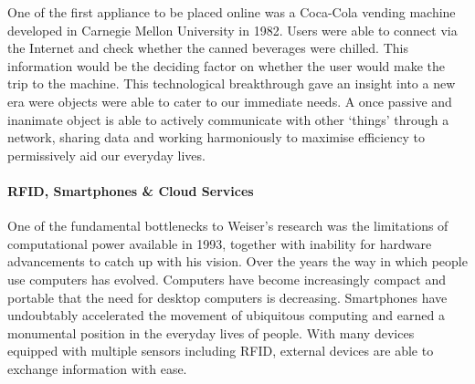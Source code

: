 \documentclass[a4paper, 11pt]{article}
\begin{document}
One of the first appliance to be placed online was a Coca-Cola vending machine developed in Carnegie Mellon University in 1982. Users were able to connect via the Internet and check whether the canned beverages were chilled. This information would be the deciding factor on whether the user would make the trip to the machine. This technological breakthrough gave an insight into a new era were objects were able to cater to our immediate needs. A once passive and inanimate object is able to actively communicate with other `things' through a network, sharing data and working harmoniously to maximise efficiency to permissively aid our everyday lives.

\paragraph{RFID, Smartphones \& Cloud Services}One of the fundamental bottlenecks to Weiser's research was the limitations of computational power available in 1993\cite{weiserLimit}, together with inability for hardware advancements to catch up with his vision. Over the years the way in which people use computers has evolved. Computers have become increasingly compact and portable that the need for desktop computers is decreasing. Smartphones have undoubtably accelerated the movement of ubiquitous computing and earned a monumental position in the everyday lives of people. With many devices equipped with multiple sensors including RFID, external devices are able to exchange information with ease.
\end{document}
